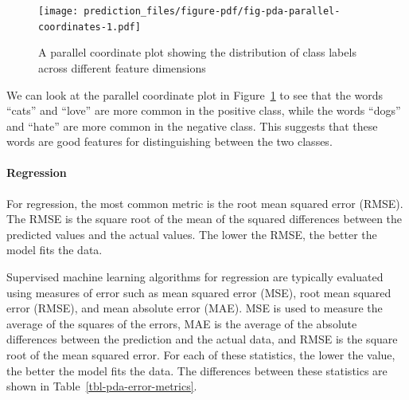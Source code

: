 \documentclass[
  letterpaper,
]{latex/krantz}
\let\oldparagraph\paragraph
\renewcommand{\paragraph}[1]{\oldparagraph{#1}\mbox{}}
\begin{document}
\begin{figure}[h]

{\centering \texttt{[image: prediction\_files/figure-pdf/fig-pda-parallel-coordinates-1.pdf]}

}

\caption{\label{fig-pda-parallel-coordinates}A parallel coordinate plot
showing the distribution of class labels across different feature
dimensions}

\end{figure}

We can look at the parallel coordinate plot in
Figure~\ref{fig-pda-parallel-coordinates} to see that the words ``cats''
and ``love'' are more common in the positive class, while the words
``dogs'' and ``hate'' are more common in the negative class. This
suggests that these words are good features for distinguishing between
the two classes.

\hypertarget{pda-workflow-regression}{%
\paragraph{Regression}\label{pda-workflow-regression}}

For regression, the most common metric is the root mean squared error
(RMSE). The RMSE is the square root of the mean of the squared
differences between the predicted values and the actual values. The
lower the RMSE, the better the model fits the data.

Supervised machine learning algorithms for regression are typically
evaluated using measures of error such as mean squared error (MSE), root
mean squared error (RMSE), and mean absolute error (MAE). MSE is used to
measure the average of the squares of the errors, MAE is the average of
the absolute differences between the prediction and the actual data, and
RMSE is the square root of the mean squared error. For each of these
statistics, the lower the value, the better the model fits the data. The
differences between these statistics are shown in
Table~\ref{tbl-pda-error-metrics}.
\end{document}
